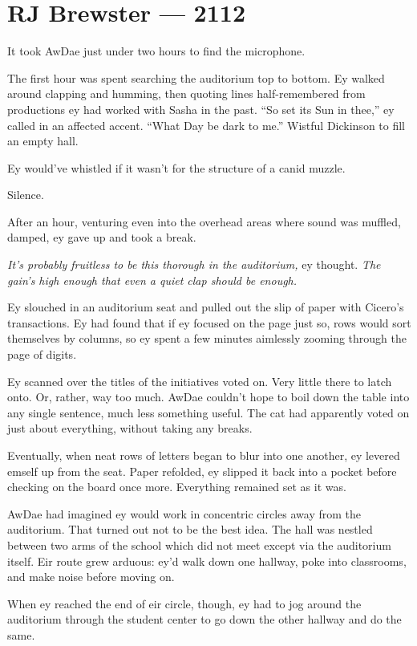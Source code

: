 \hypertarget{rj-brewster-2112}{%
\chapter*{RJ Brewster — 2112}\label{rj-brewster-2112}}

It took AwDae just under two hours to find the microphone.

The first hour was spent searching the auditorium top to bottom. Ey walked around clapping and humming, then quoting lines half-remembered from productions ey had worked with Sasha in the past. ``So set its Sun in thee,'' ey called in an affected accent. ``What Day be dark to me.'' Wistful Dickinson to fill an empty hall.

Ey would've whistled if it wasn't for the structure of a canid muzzle.

Silence.

After an hour, venturing even into the overhead areas where sound was muffled, damped, ey gave up and took a break.

\emph{It's probably fruitless to be this thorough in the auditorium,} ey thought. \emph{The gain's high enough that even a quiet clap should be enough.}

Ey slouched in an auditorium seat and pulled out the slip of paper with Cicero's transactions. Ey had found that if ey focused on the page just so, rows would sort themselves by columns, so ey spent a few minutes aimlessly zooming through the page of digits.

Ey scanned over the titles of the initiatives voted on. Very little there to latch onto. Or, rather, way too much. AwDae couldn't hope to boil down the table into any single sentence, much less something useful. The cat had apparently voted on just about everything, without taking any breaks.

Eventually, when neat rows of letters began to blur into one another, ey levered emself up from the seat. Paper refolded, ey slipped it back into a pocket before checking on the board once more. Everything remained set as it was.

AwDae had imagined ey would work in concentric circles away from the auditorium. That turned out not to be the best idea. The hall was nestled between two arms of the school which did not meet except via the auditorium itself. Eir route grew arduous: ey'd walk down one hallway, poke into classrooms, and make noise before moving on.

When ey reached the end of eir circle, though, ey had to jog around the auditorium through the student center to go down the other hallway and do the same.

